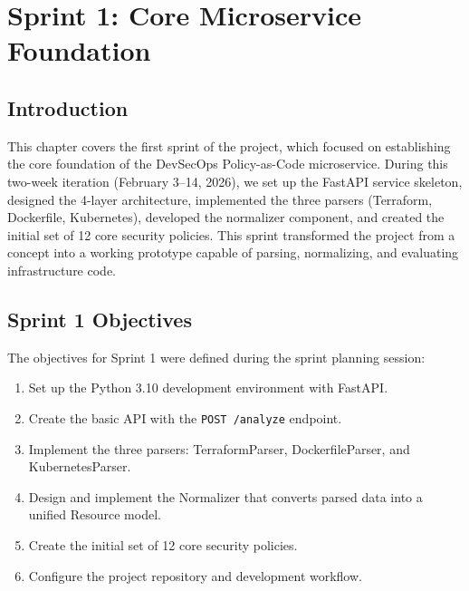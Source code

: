 
\chapter{Sprint 1: Core Microservice Foundation}

\section{Introduction}

This chapter covers the first sprint of the project, which focused on establishing the core foundation of the DevSecOps Policy-as-Code microservice. During this two-week iteration (February 3--14, 2026), we set up the FastAPI service skeleton, designed the 4-layer architecture, implemented the three parsers (Terraform, Dockerfile, Kubernetes), developed the normalizer component, and created the initial set of 12 core security policies. This sprint transformed the project from a concept into a working prototype capable of parsing, normalizing, and evaluating infrastructure code.

\section{Sprint 1 Objectives}

The objectives for Sprint 1 were defined during the sprint planning session:

\begin{enumerate}
    \item Set up the Python 3.10 development environment with FastAPI.
    \item Create the basic API with the \texttt{POST /analyze} endpoint.
    \item Implement the three parsers: TerraformParser, DockerfileParser, and KubernetesParser.
    \item Design and implement the Normalizer that converts parsed data into a unified Resource model.
    \item Create the initial set of 12 core security policies.
    \item Configure the project repository and development workflow.
\end{enumerate}

